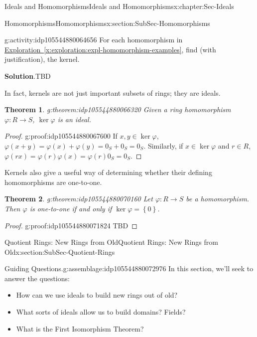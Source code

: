 \documentclass[oneside,10pt,]{book}
\newcommand{\blocktitlefont}{\relax}
\newcommand{\xreffont}{\relax}
\numberwithin{equation}{section}
\def\p{\varphi}
\newcommand{\set}[1]{\left\{ {#1} \right\}}
\newtheorem{theorem}{Theorem}[section]
\begin{document}
\begin{chapterptx}{Ideals and Homomorphisms}{}{Ideals and Homomorphisms}{}{}{x:chapter:Sec-Ideals}
\begin{sectionptx}{Homomorphisms}{}{Homomorphisms}{}{}{x:section:SubSec-Homomorphisms}
\begin{activity}{}{g:activity:idp105544880064656}
For each homomorphism in \hyperref[x:exploration:expl-homomorphism-examples]{Exploration~{\xreffont\ref{x:exploration:expl-homomorphism-examples}}}, find (with justification), the kernel.%
\par\smallskip%
\noindent\textbf{\blocktitlefont Solution}.\hypertarget{g:solution:idp105544880065808}{}\quad{}TBD\end{activity}%
In fact, kernels are not just important subsets of rings; they are ideals.%
\begin{theorem}{}{}{g:theorem:idp105544880066320}%
Given a ring homomorphism \(\p : R\to S\), \(\ker\p\) is an ideal.%
\end{theorem}
\begin{proof}{}{g:proof:idp105544880067600}
If \(x,y\in \ker\p\), \(\p(x+y) = \p(x) + \p(y) = 0_S + 0_S = 0_S\). Similarly, if \(x\in \ker \p\) and \(r\in R\), \(\p(rx) = \p(r) \p(x) = \p(r) 0_S = 0_S\).%
\end{proof}
Kernels also give a useful way of determining whether their defining homomorphisms are one-to-one.%
\begin{theorem}{}{}{g:theorem:idp105544880070160}%
Let \(\p : R\to S\) be a homomorphism. Then \(\p\) is one-to-one if and only if \(\ker\p = \set{0}\).%
\end{theorem}
\begin{proof}{}{g:proof:idp105544880071824}
TBD\end{proof}
\end{sectionptx}
%
%
\typeout{************************************************}
\typeout{************************************************}
%
\begin{sectionptx}{Quotient Rings: New Rings from Old}{}{Quotient Rings: New Rings from Old}{}{}{x:section:SubSec-Quotient-Rings}
\begin{assemblage}{Guiding Questions.}{g:assemblage:idp105544880072976}%
In this section, we'll seek to answer the questions: %
\begin{itemize}[label=\textbullet]
\item{}How can we use ideals to build new rings out of old?%
\item{}What sorts of ideals allow us to build domains? Fields?%
\item{}What is the First Isomorphism Theorem?%
\end{itemize}
%
\end{assemblage}
\begin{introduction}{}%

\end{introduction}
\end{sectionptx}
\end{chapterptx}
\end{document}
